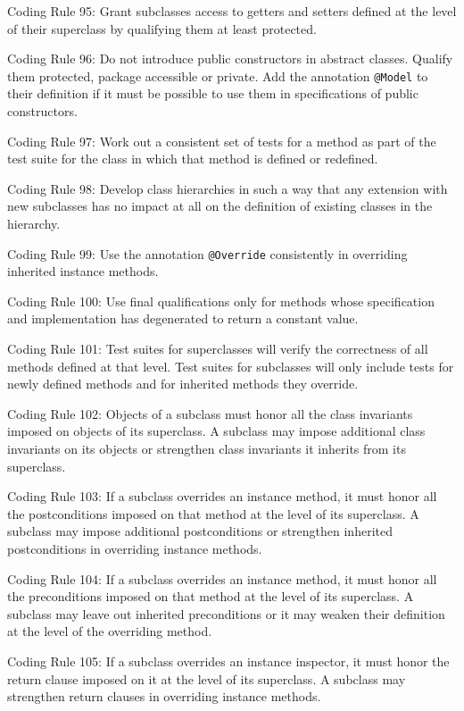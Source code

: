 \documentclass{article}
\begin{document}
\par Coding Rule 95: Grant subclasses access to getters and setters defined at the level of their superclass by qualifying them at least protected.
\par Coding Rule 96: Do not introduce public constructors in abstract classes. Qualify them  protected, package accessible or private. Add the annotation \texttt{@Model} to their definition  if it must be possible to use them in specifications of public constructors.
\par Coding Rule 97: Work out a consistent set of tests for a method as part of the test suite  for the class in which that method is defined or redefined.
\par Coding Rule 98: Develop class hierarchies in such a way that any extension with new subclasses has no impact at all on the definition of existing classes in the hierarchy.
\par Coding Rule 99: Use the annotation \texttt{@Override} consistently in overriding inherited instance methods.
\par Coding Rule 100: Use final qualifications only for methods whose specification and implementation has degenerated to return a constant value. 
\par Coding Rule 101: Test suites for superclasses will verify the correctness of all methods  defined at that level. Test suites for subclasses will only include tests for newly defined  methods and for inherited methods they override.
\par Coding Rule 102: Objects of a subclass must honor all the class invariants imposed on  objects of its superclass. A subclass may impose additional class invariants on its  objects or strengthen class invariants it inherits from its superclass.
\par Coding Rule 103: If a subclass overrides an instance method, it must honor all the postconditions imposed on that method at the level of its superclass. A subclass may impose additional postconditions or strengthen inherited postconditions in overriding  instance methods.
\par Coding Rule 104: If a subclass overrides an instance method, it must honor all the preconditions imposed on that method at the level of its superclass. A subclass may leave out inherited preconditions or it may weaken their definition at the level of the overriding method.
\par Coding Rule 105: If a subclass overrides an instance inspector, it must honor the return  clause imposed on it at the level of its superclass. A subclass may strengthen return  clauses in overriding instance methods.
\end{document}
